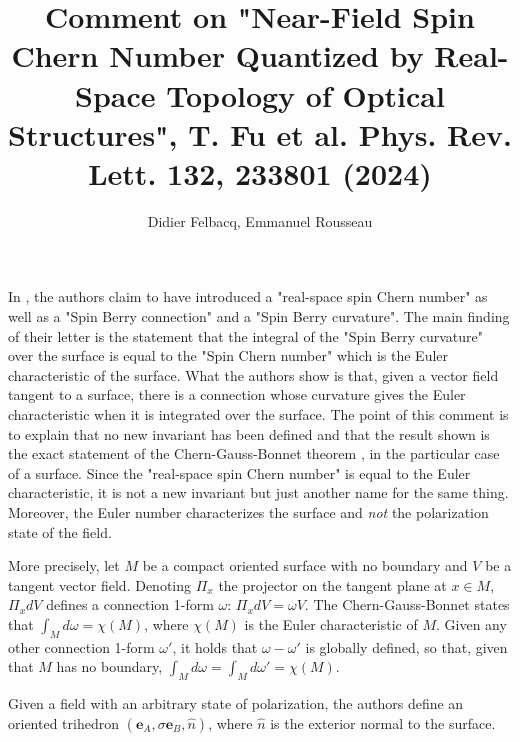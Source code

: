 \documentclass[aps, prl,12pt,reprint]{revtex4-2}
\def \e{\mathbf{e}}
\begin{document}
\title{Comment on "Near-Field Spin Chern Number Quantized by Real-Space Topology of Optical Structures", T. Fu et al. Phys. Rev. Lett. 132, 233801 (2024)}

\author{Didier Felbacq, Emmanuel Rousseau}
















\maketitle


In \cite{PRL}, the authors claim to have introduced a "real-space spin Chern number" as well as a "Spin Berry connection" and a "Spin Berry curvature". The main finding of their letter is the statement that the integral of the "Spin Berry curvature" over the surface is equal to the "Spin Chern number" which is the Euler characteristic of the surface. What the authors show is that, given a vector field tangent to a surface, there is a connection whose curvature gives the Euler characteristic when it is integrated over the surface. The point of this comment is to explain that no new invariant has been defined and that the result shown is the exact statement of the Chern-Gauss-Bonnet theorem \cite{docarmo}, in the particular case of a surface. Since the "real-space spin Chern number" is equal to the Euler characteristic, it is not a new invariant but just another name for the same thing. Moreover, the Euler number characterizes the surface and {\it not} the polarization state of the field.

More precisely, let $M$ be a compact oriented surface with no boundary and $V$ be a tangent vector field. Denoting $\Pi_x$ the projector on the tangent plane at $x \in M$, $\Pi_x dV$ defines a connection 1-form $\omega$: $\Pi_x dV=\omega V$. The Chern-Gauss-Bonnet states that $\int_M d\omega=\chi(M)$, where $\chi(M)$ is the Euler characteristic of $M$. Given any other connection 1-form $\omega'$, it holds that $\omega-\omega'$ is globally defined, so that, given that $M$ has no boundary, $\int_M d\omega=\int_M d\omega'=\chi(M)$.

Given a field with an arbitrary state of polarization, the authors define an oriented trihedron $(\e_A,\sigma \e_B, \hat{n})$, where $\hat{n}$ is the exterior normal to the surface.
\end{document}
